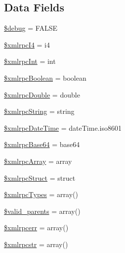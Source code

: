 \subsection*{Data Fields}
\begin{DoxyCompactItemize}
\item 
\mbox{\hyperlink{class_c_i___xmlrpc_a85ae3e64cd40e9564adceb010085e9dd}{\$debug}} = F\+A\+L\+SE
\item 
\mbox{\hyperlink{class_c_i___xmlrpc_a4d41d61a02c60406c56254f0988b8141}{\$xmlrpc\+I4}} = \textquotesingle{}i4\textquotesingle{}
\item 
\mbox{\hyperlink{class_c_i___xmlrpc_a1bf451bf41226cf1702f54fa46b041f2}{\$xmlrpc\+Int}} = \textquotesingle{}int\textquotesingle{}
\item 
\mbox{\hyperlink{class_c_i___xmlrpc_abb241cb9cac2595c7ef28106808ec438}{\$xmlrpc\+Boolean}} = \textquotesingle{}boolean\textquotesingle{}
\item 
\mbox{\hyperlink{class_c_i___xmlrpc_aa412c6bea7572d0e508b5ef9d2213db3}{\$xmlrpc\+Double}} = \textquotesingle{}double\textquotesingle{}
\item 
\mbox{\hyperlink{class_c_i___xmlrpc_a69f8b2c87014597d1f5509ec934ceeea}{\$xmlrpc\+String}} = \textquotesingle{}string\textquotesingle{}
\item 
\mbox{\hyperlink{class_c_i___xmlrpc_ad0ef2c8353643b73afe4636a5fb84cff}{\$xmlrpc\+Date\+Time}} = \textquotesingle{}date\+Time.\+iso8601\textquotesingle{}
\item 
\mbox{\hyperlink{class_c_i___xmlrpc_a95dc3164d1c3e1fdaf7185095fb376ae}{\$xmlrpc\+Base64}} = \textquotesingle{}base64\textquotesingle{}
\item 
\mbox{\hyperlink{class_c_i___xmlrpc_aedecd71f2438e9a44a8f5a1dc73f4c7a}{\$xmlrpc\+Array}} = \textquotesingle{}array\textquotesingle{}
\item 
\mbox{\hyperlink{class_c_i___xmlrpc_a9a499285050ed5c867eec71854231f01}{\$xmlrpc\+Struct}} = \textquotesingle{}struct\textquotesingle{}
\item 
\mbox{\hyperlink{class_c_i___xmlrpc_a2b937e1ca5ee8495f0251a74222cec64}{\$xmlrpc\+Types}} = array()
\item 
\mbox{\hyperlink{class_c_i___xmlrpc_a801945a338a9dee5f723c00cb71657b7}{\$valid\+\_\+parents}} = array()
\item 
\mbox{\hyperlink{class_c_i___xmlrpc_a915a90a791db11a94f665567d2f5ad01}{\$xmlrpcerr}} = array()
\item 
\mbox{\hyperlink{class_c_i___xmlrpc_a89bbdd6a565dd3af2378b44fc5f156a0}{\$xmlrpcstr}} = array()

\end{DoxyCompactItemize}
